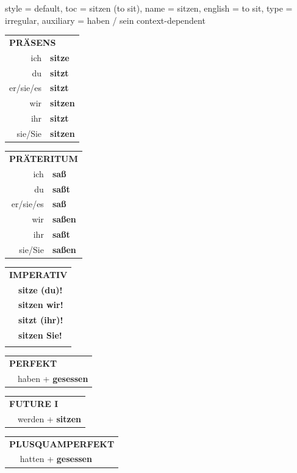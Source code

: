 \begin{verbentry}{
  style = {default},
  toc = {sitzen (to sit)},
  name = {sitzen},
  english = {to sit},
  type = {irregular},
  auxiliary = {haben / sein context-dependent}
}
  \begin{tabular}{rl}
     \multicolumn{2}{l}{\textbf{PRÄSENS} }\\
    ich & \textbf{sitze}\\
    du & \textbf{sitzt}\\
    er/sie/es & \textbf{sitzt}\\
    wir & \textbf{sitzen}\\
    ihr & \textbf{sitzt}\\
    sie/Sie & \textbf{sitzen}\\
  \end{tabular}
  \hfill
  \begin{tabular}{rl}
    \multicolumn{2}{l}{\textbf{PRÄTERITUM} }\\
    ich & \textbf{saß}\\
    du & \textbf{saßt}\\
    er/sie/es & \textbf{saß}\\
    wir & \textbf{saßen}\\
    ihr & \textbf{saßt}\\
    sie/Sie & \textbf{saßen}\\
  \end{tabular}
  \hfill
  \begin{tabular}{rl}
     \multicolumn{2}{l}{\textbf{IMPERATIV} }\\
   & \textbf{sitze (du)!}\\
   & \textbf{sitzen wir!}\\
   & \textbf{sitzt (ihr)!}\\
   & \textbf{sitzen Sie!}\\
   & \vspace{10pt}
  \end{tabular}

 \vspace{10pt}

 \begin{tabular}{rl}
     \multicolumn{2}{l}{\textbf{PERFEKT}}\\
   & haben + \textbf{gesessen}\\
  \end{tabular}
\hfill
\begin{tabular}{rl}
    \multicolumn{2}{l}{\textbf{FUTURE I}}\\
   & werden + \textbf{sitzen}\\
  \end{tabular}
\hfill
\begin{tabular}{rl}
    \multicolumn{2}{l}{\textbf{PLUSQUAMPERFEKT}}\\
   & hatten + \textbf{gesessen}\\
  \end{tabular}


\end{verbentry}
